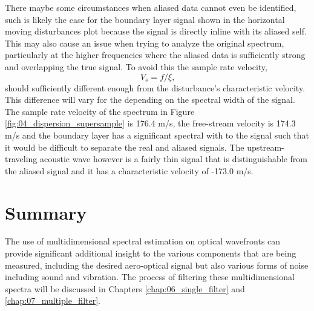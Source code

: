 There maybe some circumstances when aliased data cannot even be identified, such is likely the case for the boundary layer signal shown in the horizontal moving disturbances plot because the signal is directly inline with its aliased self.
This may also cause an issue when trying to analyze the original spectrum, particularly at the higher frequencies where the aliased data is sufficiently strong and overlapping the true signal.
To avoid this the sample rate velocity,
\begin{equation}
  V_s=f/\xi \textrm{,}
\end{equation}
should sufficiently different enough from the disturbance's characteristic velocity.
This difference will vary for the depending on the spectral width of the signal.
The sample rate velocity of the spectrum in Figure \ref{fig:04_dispersion_supersample} is 176.4 m/s, the free-stream velocity is 174.3 m/s and the boundary layer has a significant spectral with to the signal such that it would be difficult to separate the real and aliased signals.
The upstream-traveling acoustic wave however is a fairly thin signal that is distinguishable from the aliased signal and it has a characteristic velocity of -173.0 m/s.

\section{Summary}
The use of multidimensional spectral estimation on optical wavefronts can provide significant additional insight to the various components that are being measured, including the desired aero-optical signal but also various forms of noise including sound and vibration.
The process of filtering these multidimensional spectra will be discussed in Chapters \ref{chap:06_single_filter} and \ref{chap:07_multiple_filter}.
